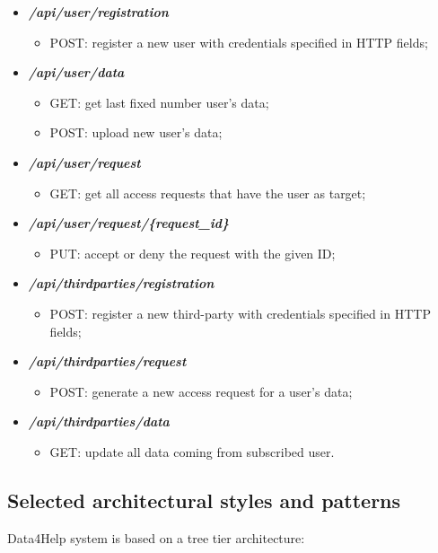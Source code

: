 \documentclass[DD.tex]{subfiles}
\begin{document}
\begin{itemize}

	\item \textit{\textbf{/api/user/registration}}
		\begin{itemize}
			\item POST: register a new user with credentials specified in HTTP fields;
		\end{itemize}
	\item \textit{\textbf{/api/user/data}}
		\begin{itemize}
			\item GET: get last fixed number user's data;
			\item POST: upload new user's data;
		\end{itemize}
	\item \textit{\textbf{/api/user/request}}
		\begin{itemize}
			\item GET: get all access requests that have the user as target;
		\end{itemize}
	\item \textit{\textbf{/api/user/request/\{request\_id\}}}
		\begin{itemize}
			\item PUT: accept or deny the request with the given ID;
		\end{itemize}
	\item \textit{\textbf{/api/thirdparties/registration}}
		\begin{itemize}
			\item POST: register a new third-party with credentials specified in HTTP fields;
		\end{itemize}
	\item \textit{\textbf{/api/thirdparties/request}}
		\begin{itemize}
			\item POST: generate a new access request for a user's data;
		\end{itemize}
	\item \textit{\textbf{/api/thirdparties/data}}
		\begin{itemize}
			\item GET: update all data coming from subscribed user.
		\end{itemize}
\end{itemize}


\newpage
\subsection{Selected architectural styles and patterns}
Data4Help system is based on a tree tier architecture:
\end{document}
